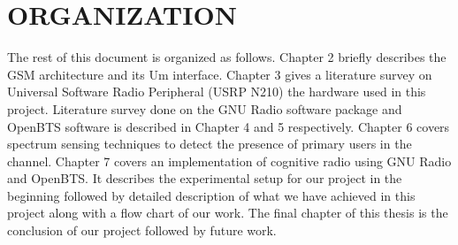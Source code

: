 \section{ORGANIZATION}
The rest of this document is organized as follows. Chapter 2 briefly describes
the GSM architecture and its Um interface. Chapter 3 gives a literature survey
on Universal Software Radio Peripheral (USRP N210) the hardware used in this 
project. Literature survey done on the GNU Radio software package and OpenBTS 
software is described in Chapter 4 and 5 respectively. Chapter 6 covers 
spectrum sensing techniques to detect the presence of primary users in the 
channel.  Chapter 7 covers an implementation of cognitive radio using GNU Radio
and OpenBTS. It describes the experimental setup for our project in the 
beginning followed by detailed description of what we have achieved in this 
project along with a flow chart of our work. The final chapter of this thesis 
is the conclusion of our project followed by future work. 
